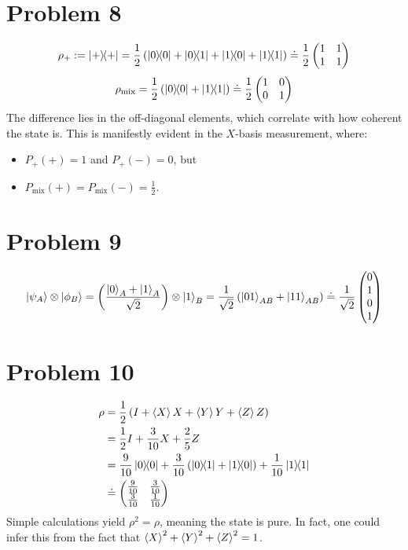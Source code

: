 \documentclass[11pt]{article}
\begin{document}
\section*{Problem 8}
\[
    \rho_+ := \ketbra{+}{+} = \frac{1}{2} \left(
        \ketbra{0}{0} + \ketbra{0}{1} + \ketbra{1}{0} + \ketbra{1}{1}
    \right)
    \doteq \frac{1}{2} \begin{pmatrix} 1 & 1 \\ 1 & 1 \end{pmatrix}
\]
\[
    \rho_{\text{mix}} = \frac{1}{2} \left( \ketbra{0}{0} + \ketbra{1}{1} \right)
    \doteq \frac{1}{2} \begin{pmatrix} 1 & 0 \\ 0 & 1 \end{pmatrix}
\]
The difference lies in the off-diagonal elements, which correlate with how coherent the state is.
This is manifestly evident in the $X$-basis measurement, where:
\begin{itemize}
    \item $P_+(+)=1$ and $P_+(-) = 0$, but
    \item $P_{\text{mix}}(+) = P_{\text{mix}}(-) = \frac{1}{2}$.
\end{itemize}

\section*{Problem 9}
\[
    \ket{\psi_A}\otimes\ket{\phi_B}
    = \left( \frac{\ket{0}_A + \ket{1}_A}{\sqrt{2}} \right) \otimes \ket{1}_B
    = \frac{1}{\sqrt{2}} \left( \ket{01}_{AB} + \ket{11}_{AB} \right)
    \doteq \frac{1}{\sqrt{2}} \begin{pmatrix} 0 \\ 1 \\ 0 \\ 1 \end{pmatrix}
\]

\section*{Problem 10}
\begin{align*}
    \rho
    &= \frac{1}{2} \left( I + \braket{X} X + \braket{Y} Y + \braket{Z} Z \right) \\
    &= \frac{1}{2} I + \frac{3}{10} X + \frac{2}{5} Z \\
    &= \frac{9}{10} \ketbra{0}{0}
      + \frac{3}{10} \left( \ketbra{0}{1} + \ketbra{1}{0} \right)
      + \frac{1}{10} \ketbra{1}{1} \\
    &\doteq \begin{pmatrix}
        \frac{9}{10} & \frac{3}{10} \\ \frac{3}{10} & \frac{1}{10} 
    \end{pmatrix}
\end{align*}
Simple calculations yield $\rho^2 = \rho$, meaning the state is pure.
In fact, one could infer this from the fact that $\braket{X}^2 + \braket{Y}^2 + \braket{Z}^2 = 1$.
\end{document}
